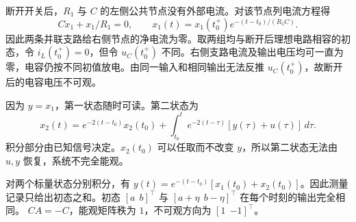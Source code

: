 
\sol 断开开关后，$R_1$ 与 $C$ 的左侧公共节点没有外部电流。对该节点列电流方程得
\[
     C\dot x_1+x_1/R_1=0,\qquad
     x_1(t)=x_1(t_0^+)e^{-(t-t_0)/(R_1C)} .
\]
因此两条并联支路给右侧节点的净电流为零。取两组均与断开后理想电路相容的初态，令 $i_L(t_0^+)=0$，但令 $u_C(t_0^+)$ 不同。右侧支路电流及输出电压均可一直为零，电容仍按不同初值放电。由同一输入和相同输出无法反推 $u_C(t_0^+)$，故断开后的电容电压不可观。



\sol 因为 $y=x_1$，第一状态随时可读。第二状态为
\[
     x_2(t)=e^{-2(t-t_0)}x_2(t_0)
        +\int_{t_0}^t e^{-2(t-\tau)}[y(\tau)+u(\tau)]\,d\tau .
\]
积分部分由已知信号决定。$x_2(t_0)$ 可以任取而不改变 $y$，所以第二状态无法由 $u,y$ 恢复，系统不完全能观。



\sol 对两个标量状态分别积分，有 $y(t)=e^{-(t-t_0)}[x_1(t_0)+x_2(t_0)]$。因此测量记录只给出初态之和。初态 $[a\ \ b]^\top$ 与 $[a+\eta\ \ b-\eta]^\top$ 在每个时刻的输出完全相同。
$CA=-C$，能观矩阵秩为 $1$，不可观方向为 $[1\ \ {-1}]^\top$。
